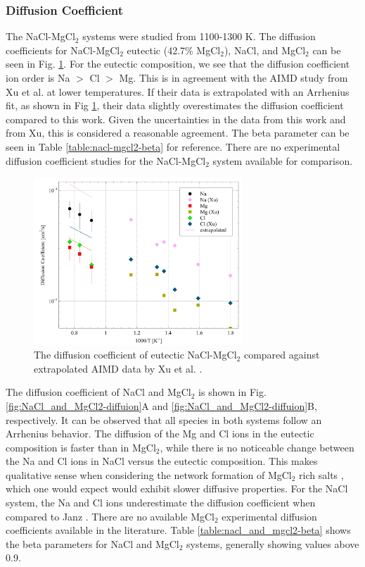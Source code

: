 \documentclass[review]{elsarticle}
\begin{document}
\subsubsection{Diffusion Coefficient}
The NaCl-MgCl$_2$ systems were studied from 1100-1300 K. The diffusion coefficients for NaCl-MgCl$_2$ eutectic (42.7\% MgCl$_{2}$), NaCl, and MgCl$_2$ can be seen in Fig. \ref{fig:NaCl-MgCl2-diffuion}. For the eutectic composition, we see that the diffusion coefficient ion order is Na $>$ Cl $>$ Mg. This is in agreement with the AIMD study from Xu et al. \cite{xu2020powerful} at lower temperatures. If their data is extrapolated with an Arrhenius fit, as shown in Fig \ref{fig:NaCl-MgCl2-diffuion}, their data slightly overestimates the diffusion coefficient compared to this work. Given the uncertainties in the data from this work and from Xu, this is considered a reasonable agreement. The beta parameter can be seen in Table \ref{table:nacl-mgcl2-beta} for reference. There are no experimental diffusion coefficient studies for the NaCl-MgCl$_2$ system available for comparison.
\begin{figure}[!h]
 \centering
 \includegraphics[width=0.7\textwidth]{diff_eutectic_nacl_mgcl2.jpg} 
 \caption{The diffusion coefficient of eutectic NaCl-MgCl$_2$ compared against extrapolated AIMD data by Xu et al. \cite{xu2020powerful}.}
 \label{fig:NaCl-MgCl2-diffuion}
\end{figure} 

 The diffusion coefficient of NaCl and MgCl$_2$ is shown in Fig. \ref{fig:NaCl_and_MgCl2-diffuion}A and \ref{fig:NaCl_and_MgCl2-diffuion}B, respectively. It can be observed that all species in both systems follow an Arrhenius behavior. The diffusion of the Mg and Cl ions in the eutectic composition is faster than in MgCl$_2$, while there is no noticeable change between the Na and Cl ions in NaCl versus the eutectic composition. This makes qualitative sense when considering the network formation of MgCl$_2$ rich salts \cite{LIANG2020}, which one would expect would exhibit slower diffusive properties. For the NaCl system, the Na and Cl ions underestimate the diffusion coefficient when compared to Janz \cite{janz_Diffusion}. There are no available MgCl$_2$ experimental diffusion coefficients available in the literature. Table \ref{table:nacl_and_mgcl2-beta} shows the beta parameters for NaCl and MgCl$_2$ systems, generally showing values above 0.9. 
\end{document}

